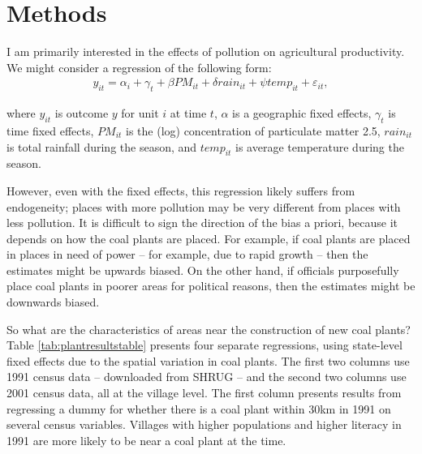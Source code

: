 \documentclass[
]{article}
\begin{document}
\hypertarget{methods}{%
\section{Methods}\label{methods}}

\label{identification}

I am primarily interested in the effects of pollution on agricultural productivity. We might consider a regression of the following form:
\begin{gather} y_{it} = \alpha_{i} + \gamma_{t} + \beta PM_{it} + \delta rain_{it} + \psi temp_{it} + \varepsilon_{it}, \end{gather}

where \(y_{it}\) is outcome \(y\) for unit \(i\) at time \(t\), \(\alpha\) is a geographic fixed effects, \(\gamma_t\) is time fixed effects, \(PM_{it}\) is the (log) concentration of particulate matter 2.5, \(rain_{it}\) is total rainfall during the season, and \(temp_{it}\) is average temperature during the season.

However, even with the fixed effects, this regression likely suffers from endogeneity; places with more pollution may be very different from places with less pollution. It is difficult to sign the direction of the bias a priori, because it depends on how the coal plants are placed. For example, if coal plants are placed in places in need of power -- for example, due to rapid growth -- then the estimates might be upwards biased. On the other hand, if officials purposefully place coal plants in poorer areas for political reasons, then the estimates might be downwards biased.

So what are the characteristics of areas near the construction of new coal plants? Table \ref{tab:plantresultstable} presents four separate regressions, using state-level fixed effects due to the spatial variation in coal plants. The first two columns use 1991 census data -- downloaded from SHRUG -- and the second two columns use 2001 census data, all at the village level. The first column presents results from regressing a dummy for whether there is a coal plant within 30km in 1991 on several census variables. Villages with higher populations and higher literacy in 1991 are more likely to be near a coal plant at the time.
\end{document}
